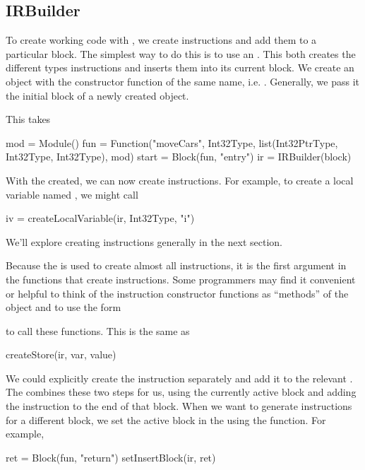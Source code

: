\documentclass[article]{jss}
\begin{document}
\subsection{IRBuilder}
To create working code with \llvm, we create instructions and add them
to a particular block.  The simplest way to do this is to use an
.  This both creates the different types
instructions and inserts them into its current block.  We create an
 object with the constructor function of the same
name, i.e. .  Generally, we pass it the initial block
of a newly created  object.

This takes 
\begin{RCode}
mod = Module()
fun = Function("moveCars", Int32Type, list(Int32PtrType, Int32Type, Int32Type), mod)
start = Block(fun, "entry")
ir = IRBuilder(block)  
\end{RCode}

With the  created, we can now create instructions.
For example, to create a local variable named , we might
call
\begin{RCode}
iv = createLocalVariable(ir, Int32Type, "i")  
\end{RCode}
We'll explore creating instructions generally in the next
section. 

Because the  is used to create almost all
instructions, it is the first argument in the functions
that create instructions.
Some programmers may find it convenient or helpful to 
think of the instruction constructor functions
as ``methods'' of the  object and
to use the form
to call these functions.
This is the same as
\begin{RCode}
createStore(ir, var, value)
\end{RCode}

We could explicitly create the instruction separately and add it to
the relevant .  The  combines these
two steps for us, using the currently active block and adding the
instruction to the end of that block.  When we want to generate
instructions for a different block, we set the active block in the
 using the  function.
For example, 
\begin{RCode}
ret = Block(fun, "return")
setInsertBlock(ir, ret)
\end{RCode}
\end{document}
